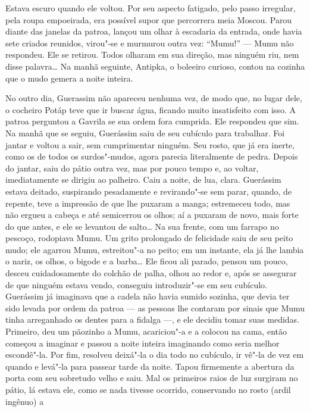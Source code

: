 Estava escuro quando ele voltou. Por seu aspecto fatigado, pelo passo
irregular, pela roupa empoeirada, era possível supor que percorrera meia
Moscou. Parou diante das janelas da patroa, lançou um olhar à escadaria
da entrada, onde havia sete criados reunidos, virou"-se e murmurou outra
vez: ``Mumu!'' --- Mumu não respondeu. Ele se retirou. Todos olharam em
sua direção, mas ninguém riu, nem disse palavra\ldots{} Na manhã seguinte,
Antipka, o boleeiro curioso, contou na cozinha que o mudo gemera a noite
inteira.

No outro dia, Guerassim não apareceu nenhuma vez, de modo que, no lugar
dele, o cocheiro Potáp teve que ir buscar água, ficando muito
insatisfeito com isso. A patroa perguntou a Gavrila se sua ordem fora
cumprida. Ele respondeu que sim. Na manhã que se seguiu, Guerássim saiu
de seu cubículo para trabalhar. Foi jantar e voltou a sair, sem
cumprimentar ninguém. Seu rosto, que já era inerte, como os de todos os
surdos"-mudos, agora parecia literalmente de pedra. Depois do jantar,
saiu do pátio outra vez, mas por pouco tempo e, ao voltar, imediatamente
se dirigiu ao palheiro. Caiu a noite, de lua, clara. Guerássim estava
deitado, suspirando pesadamente e revirando"-se sem parar, quando, de
repente, teve a impressão de que lhe puxaram a manga; estremeceu todo,
mas não ergueu a cabeça e até semicerrou os olhos; aí a puxaram de novo,
mais forte do que antes, e ele se levantou de salto\ldots{} Na sua frente,
com um farrapo no pescoço, rodopiava Mumu. Um grito prolongado de
felicidade saiu de seu peito mudo; ele agarrou Mumu, estreitou"-a no
peito; em um instante, ela já lhe lambia o nariz, os olhos, o bigode e a
barba\ldots{} Ele ficou ali parado, pensou um pouco, desceu cuidadosamente do
colchão de palha, olhou ao redor e, após se assegurar de que ninguém
estava vendo, conseguiu introduzir"-se em seu cubículo. Guerássim já
imaginava que a cadela não havia sumido sozinha, que devia ter sido
levada por ordem da patroa --- as pessoas lhe contaram por sinais que
Mumu tinha arreganhado os dentes para a fidalga ---, e ele decidiu tomar
suas medidas. Primeiro, deu um pãozinho a Mumu, acariciou"-a e a colocou
na cama, então começou a imaginar e passou a noite inteira imaginando
como seria melhor escondê"-la. Por fim, resolveu deixá"-la o dia todo no
cubículo, ir vê"-la de vez em quando e levá"-la para passear tarde da
noite. Tapou firmemente a abertura da porta com seu sobretudo velho e
saiu. Mal os primeiros raios de luz surgiram no pátio, lá estava ele,
como se nada tivesse ocorrido, conservando no rosto (ardil ingênuo) a
